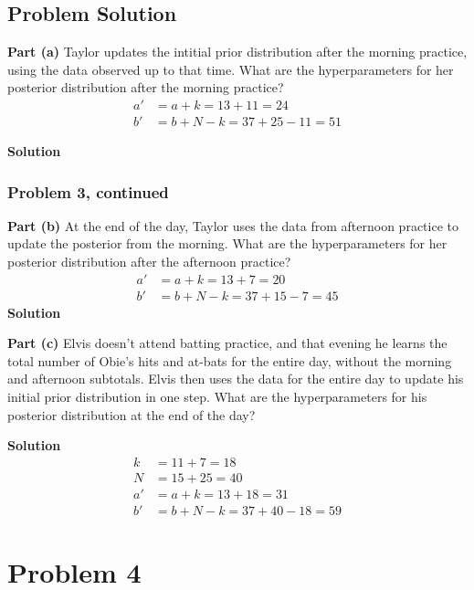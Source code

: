 \documentclass[12pt]{article}
\theoremstyle{definition}
\begin{document}
\subsection*{Problem Solution}

\noindent
{\bf Part (a)} Taylor updates the intitial prior distribution after the morning practice, using the data observed up to that time. What are the hyperparameters for her posterior distribution after the morning practice?
\begin{align*}
a' &= a + k = 13 + 11 = 24\\
b' &= b + N - k = 37 + 25 - 11 = 51
\end{align*}

\bigskip
\noindent
{\bf Solution} 

\newpage
\subsubsection*{Problem 3, continued}

\noindent
{\bf Part (b)} At the end of the day, Taylor uses the data from afternoon practice to update the posterior from the morning. What are the hyperparameters for her posterior distribution after the afternoon practice?
\begin{align*}
a' &= a + k = 13 + 7 = 20\\
b' &= b + N - k = 37 + 15 - 7 = 45
\end{align*}
\bigskip
\noindent
{\bf Solution} 


\vspace{3in}
\noindent
{\bf Part (c)} Elvis doesn't attend batting practice, and that evening he learns the total number of Obie's hits and at-bats for the entire day, without the morning and afternoon subtotals. Elvis then uses the data for the entire day to update his initial prior distribution in one step. What are the hyperparameters for his posterior distribution at the end of the day?

\bigskip
\noindent
{\bf Solution} 
\begin{align*}
k &= 11 + 7 = 18\\
N &= 15 + 25 = 40\\
a' &= a + k = 13 + 18 = 31\\
b' &= b + N - k = 37 + 40 - 18 = 59
\end{align*}





\newpage
\section*{Problem 4}
\end{document}
